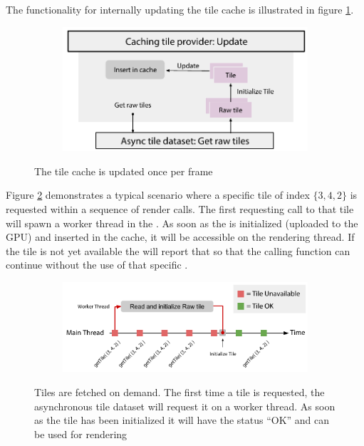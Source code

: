 The functionality for internally updating the tile cache is illustrated in figure \ref{fig:cachingtileprovider_update}.

\begin{figure}[htbp]
    \centering
    \begin{subfigure}[bt]{0.6\textwidth}
        \includegraphics[width=\textwidth]{figures/implementation/tileprovider/cachingtileprovider_update.pdf}
    \end{subfigure}
    \caption{The tile cache is updated once per frame}
    \label{fig:cachingtileprovider_update}
\end{figure}

Figure \ref{fig:cachingtileprovider_tilerequest} demonstrates a typical scenario where a specific tile of index $\{3, 4, 2\}$ is requested within a sequence of render calls. The first requesting call to that tile will spawn a worker thread in the . As soon as the  is initialized (uploaded to the GPU) and inserted in the cache, it will be accessible on the rendering thread. If the tile is not yet available the  will report that so that the calling function can continue without the use of that specific .

\begin{figure}[htbp]
    \centering
    \begin{subfigure}[bt]{0.8\textwidth}
        \includegraphics[width=\textwidth]{figures/implementation/tileprovider/cachingtileprovider_tilerequest.pdf}
    \end{subfigure}
    \caption{Tiles are fetched on demand. The first time a tile is requested, the asynchronous tile dataset will request it on a worker thread. As soon as the tile has been initialized it will have the status ``OK'' and can be used for rendering}
    \label{fig:cachingtileprovider_tilerequest}
\end{figure}

